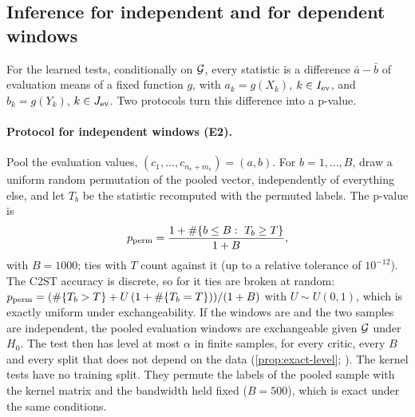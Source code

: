 \subsection{Inference for independent and for dependent windows}\label{sec:method-inference}

For the learned tests, conditionally on $\mathcal{G}$, every statistic is a difference
$\bar a-\bar b$ of evaluation means of a fixed function $g$, with $a_k=g(X_k)$, $k\in I_{\mathrm{ev}}$, and
$b_k=g(Y_k)$, $k\in J_{\mathrm{ev}}$. Two protocols turn this difference into a p-value.

\paragraph{Protocol for independent windows (E2).}
Pool the evaluation values, $(c_1,\dots,c_{n_e+m_e})=(a,b)$. For $b=1,\dots,B$, draw a uniform
random permutation of the pooled vector, independently of everything else, and let $T_b$ be the
statistic recomputed with the permuted labels. The p-value is
\begin{equation}\label{eq:perm-pvalue}
  p_{\mathrm{perm}}=\frac{1+\#\{b\le B:\ T_b\ge T\}}{1+B},
\end{equation}
with $B=1000$; ties with $T$ count against it (up to a relative tolerance of $10^{-12}$). The
C2ST accuracy is discrete, so for it ties are broken at random:
$p_{\mathrm{perm}}=(\#\{T_b>T\}+U\,(1+\#\{T_b=T\}))/(1+B)$ with $U\sim U(0,1)$, which is exactly uniform
under exchangeability. If the windows are \iid{} and the two samples are independent, the pooled
evaluation windows are exchangeable given $\mathcal{G}$ under $H_0$. The test then has level at most
$\alpha$ in finite samples, for every critic, every $B$ and every split that does not depend on
the data (\cref{prop:exact-level}; \citealp{hemerik2018exact}). The kernel tests have no training
split. They permute the labels of the pooled sample with the kernel matrix and the bandwidth held
fixed ($B=500$), which is exact under the same conditions.

